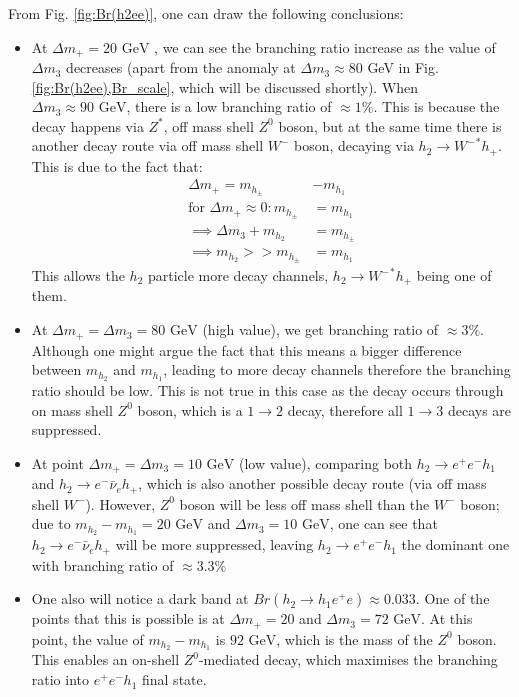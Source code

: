 \documentclass[12pt]{article}
\begin{document}
From Fig. \ref{fig:Br(h2ee)}, one can draw the following conclusions:
\begin{itemize}
    \item At $\Delta m_+= 20\text{ GeV}$ , we can see the branching ratio increase as the value of $\Delta m_3$ decreases (apart from the anomaly at $\Delta m_3 \approx 80$ GeV in Fig. \ref{fig:Br(h2ee),Br_scale}, which will be discussed shortly). When $\Delta m_3 \approx 90 \text{ GeV}$, there is a low branching ratio of $\approx 1\%$. This is because the decay happens via ${Z}^*$, off mass shell $Z^0$ boson, but at the same time there is another decay route via off mass shell $W^-$ boson, decaying via $h_2 \rightarrow {W^-}^*h_+$. This is due to the fact that:
    \begin{equation}
        \begin{split}
            \Delta m_+ = m_{h_\pm} &- m_{h_1}
            \\ \text{for }\Delta m_+ \approx 0: m_{h_\pm} &= m_{h_1}
            \\ \implies \Delta m_3 + m_{h_2} &= m_{h_\pm}
            \\\implies m_{h_2} >> m_{h_\pm} &= m_{h_1}
        \end{split}
    \end{equation}
    This allows the $h_2$ particle more decay channels, $h_2 \rightarrow {W^-}^*h_+$ being one of them.
    \item At $\Delta m_+= \Delta m_3=80 \text{ GeV}$ (high value), we get branching ratio of $\approx 3\%$. Although one might argue the fact that this means a bigger difference between $m_{h_2}$ and $m_{h_1}$, leading to more decay channels therefore the branching ratio should be low. This is not true in this case as the decay occurs through on mass shell $Z^0$ boson, which is a $1\rightarrow2$ decay, therefore all $1\rightarrow3$ decays are suppressed.
    \item At point $\Delta m_+=\Delta m_3=10 \text{ GeV}$ (low value), comparing both $h_2 \rightarrow e^+ e^- h_1$ and $h_2 \rightarrow e^- \bar{\nu}_e h_+$, which is also another possible decay route (via off mass shell $W^-$). However, $Z^0$ boson will be less off mass shell than the $W^-$ boson; due to $m_{h_2} - m_{h_1} = 20 \text{ GeV}$ and $\Delta m_3= 10 \text{ GeV}$, one can see that $h_2 \rightarrow e^- \bar{\nu}_e h_+$ will be more suppressed, leaving $h_2 \rightarrow e^+ e^- h_1$ the dominant one with branching ratio of $\approx 3.3\%$
    \item One also will notice a dark band at $Br(h_2 \rightarrow h_1 e^+e) \approx 0.033$. One of the points that this is possible is at $\Delta m_+= 20$ and $\Delta m_3=72 \text{ GeV}$. At this point, the value of $m_{h_2} - m_{h_1}$ is $ 92 \text{ GeV}$, which is the mass of the $Z^0$ boson. This enables an on-shell $Z^0$-mediated decay, which maximises the branching ratio into $e^+ e^- h_1$ final state.

\end{itemize}
\end{document}
